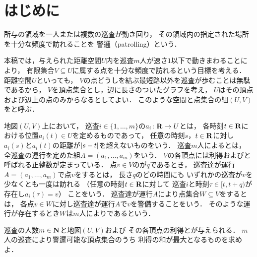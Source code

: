 \chapter{はじめに}
\label{chapter: introduction}
所与の領域を一人または複数の巡査が動き回り，
その領域内の指定された場所を十分な頻度で訪れることを
警邏（patrolling）という\cite{
  Dumitrescu:2014:CGC:2636805.2636822,
  chen2013fence,
  coene2011charlemagne,
  czyzowicz2011boundary}．

本稿では，与えられた距離空間$U$内を巡査$m$人が速さ$1$以下で動きまわることにより，
有限集合$V \subseteq U$に属する点を十分な頻度で訪れるという目標を考える．
距離空間$U$といっても，
$V$の点どうしを結ぶ最短路以外を巡査が歩むことは無駄であるから，
$V$を頂点集合とし，辺に長さのついたグラフを考え，
$U$はその頂点および辺上の点のみからなるとしてよい．
このような空間と点集合の組$(U, V)$をと呼ぶ．

地図$(U, V)$上において，
巡査$i \in \{1, \ldots, m\}$の$a _i \colon \mathbf R \to U$とは，
各時刻$t \in \mathbf R$における位置$a _i (t) \in U$を定めるものであって，
任意の時刻$s$，$t \in \mathbf R$に対し$a _i (s)$と$a _i (t)$の距離が$\lvert{s - t}\rvert$を超えないものをいう．
巡査$m$人によるとは，
全巡査の運行を定めた組$A = (a _1, \dots, a _m)$をいう．
$V$の各頂点には利得および{\maxIdletime}と呼ばれる正整数が定まっている．
点$v \in V$の{\maxIdletime}が$q$であるとき，
巡査達が運行$A = (a _1, \dots, a _m)$で点$v$をするとは，
長さ$q$のどの時間にも
いずれかの巡査が$v$を少なくとも一度は訪れる
（任意の時刻$t \in \mathbf R$に対して
巡査$i$と時刻$\tau \in [t, t + q)$が存在し$a _i (\tau) = v$）
ことをいう．
巡査達が運行$A$により点集合$W \subseteq V$をするとは，
各点$v \in W$に対し巡査達が運行$A$で$v$を警備することをいう．
そのような運行が存在するとき$W$は$m$人によりであるという．

\begin{patrollingProblem}
  巡査の人数$m \in \mathbf N$と地図$(U, V)$および
  その各頂点の利得と{\maxIdletime}が与えられる．
  $m$人の巡査により警邏可能な頂点集合のうち
  利得の和が最大となるものを求めよ．
\end{patrollingProblem}


